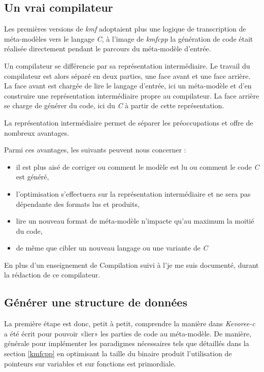 \subsection{Un vrai compilateur}

Les premières versions de \emph{kmf} adoptaient plus une logique de transcription de méta-modèles vers le langage \emph{C}, à l'image de \emph{kmfcpp} la génération de code était réalisée directement pendant le parcours du méta-modèle d'entrée.

Un compilateur se différencie par sa représentation intermédiaire. Le travail du compilateur est alors séparé en deux parties, une face avant et une face arrière. La face avant est chargée de lire le langage d'entrée, ici un méta-modèle et d'en construire une représentation intermédiaire propre au compilateur. La face arrière se charge de générer du code, ici du \emph{C} à partir de cette représentation.

La représentation intermédiaire permet de séparer les préoccupations et offre de nombreux avantages.

Parmi ces avantages, les suivants peuvent nous concerner :
\begin{itemize}
\item il est plus aisé de corriger ou comment le modèle est lu ou comment le code \emph{C} est généré,
\item l'optimisation s'effectuera sur la représentation intermédiaire et ne sera pas dépendante des formats lus et produits,
\item lire un nouveau format de méta-modèle n'impacte qu'au maximum la moitié du code,
\item de même que cibler un nouveau langage ou une variante de \emph{C}
\end{itemize}

En plus d'un enseignement de Compilation suivi à l'\univname je me suis documenté\cite{freeman2004head}, \cite{Appel2003MCI599718} durant la rédaction de ce compilateur.

\subsection{Générer une structure de données}

La première étape est donc, petit à petit, comprendre la manière dans \emph{Kevoree-c} a été écrit pour pouvoir «lier» les parties de code au méta-modèle. De manière, générale pour implémenter les paradigmes nécessaires tels que détaillés dans la section \ref{kmfcpp} en optimisant la taille du binaire produit l'utilisation de pointeurs sur variables et sur fonctions est primordiale.

